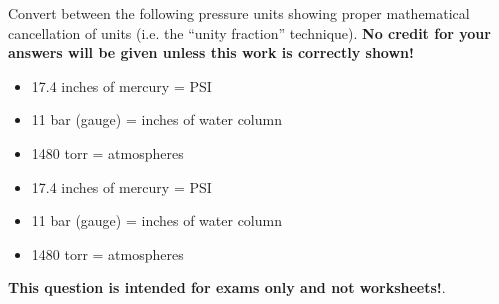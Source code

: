 

Convert between the following pressure units showing proper mathematical cancellation of units (i.e. the ``unity fraction'' technique).  {\bf No credit for your answers will be given unless this work is correctly shown!}

\begin{itemize}
\item{} 17.4 inches of mercury = \underbar{\hskip 50pt} PSI
\item{} 11 bar (gauge) = \underbar{\hskip 50pt} inches of water column
\item{} 1480 torr = \underbar{\hskip 50pt} atmospheres
\end{itemize}







\begin{itemize}
\item{} 17.4 inches of mercury =  PSI
\item{} 11 bar (gauge) =  inches of water column
\item{} 1480 torr =  atmospheres
\end{itemize}







{\bf This question is intended for exams only and not worksheets!}.


